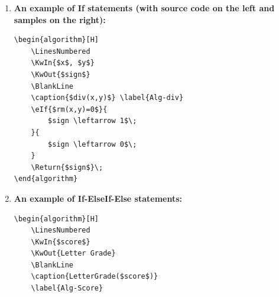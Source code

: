 \documentclass[12pt,a4paper]{article}
\begin{document}
\noindent

\noindent{}

\begin{enumerate}

    \item {\color{blue}\textbf{An example of If statements (with
        source code on the left and samples on the right):}}

        \begin{minipage}[t]{0.5\textwidth}

\begin{verbatim}
\begin{algorithm}[H]
    \LinesNumbered
    \KwIn{$x$, $y$}
    \KwOut{$sign$}
    \BlankLine
    \caption{$div(x,y)$} \label{Alg-div}
    \eIf{$rm(x,y)=0$}{
        $sign \leftarrow 1$\;
    }{
        $sign \leftarrow 0$\;
    }
    \Return{$sign$}\;
\end{algorithm}
\end{verbatim}
        \end{minipage}
        \hspace{2mm}
        \begin{minipage}[t]{0.4\textwidth}
            \begin{algorithm}[H]
                \LinesNumbered
                \BlankLine
                \caption{$div(x,y)$} \label{Alg-div}
                \;
            \end{algorithm}
        \end{minipage}

    \item {\color{blue}\textbf{An example of If-ElseIf-Else statements:}}

        \begin{minipage}[t]{0.5\textwidth}
\begin{verbatim}
\begin{algorithm}[H]
    \LinesNumbered
    \KwIn{$score$}
    \KwOut{Letter Grade}
    \BlankLine
    \caption{LetterGrade($score$)}
    \label{Alg-Score}


\end{verbatim}
\end{minipage}
\end{enumerate}
\end{document}
